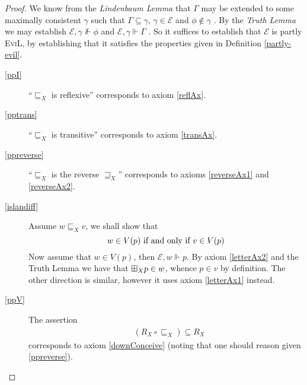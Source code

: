 \begin{proof}
We know from the \emph{Lindenbaum Lemma} that $\Gamma$ may be extended
to some maximally consistent $\gamma$ such that $\Gamma \subseteq
\gamma$, $\gamma \in \mathcal{E}$ and $\phi \nin
\gamma$ \cite[Lemma 4.17,
pg. 199]{blackburn_modal_2001}.  By the \emph{Truth Lemma} we may establish
$\mathscr{E}, \gamma \nVdash \phi$ and $\mathscr{E}, \gamma \Vdash \Gamma$ \cite[Lemma 4.21,
pgs. 201]{blackburn_modal_2001}.  So it suffices to establish
that $\mathscr{E}$ is partly \textsc{EviL}, by establishing that it
satisfies the properties given in Definition \ref{partly-evil}.

  \begin{description}
    \item[\ref{ppI}] ``$\sqsubseteq_X$ is reflexive''
      corresponds to axiom \eqref{reflAx}.
    \item[\ref{pptrans}] ``$\sqsubseteq_X$ is transitive''
      corresponds to axiom \eqref{transAx}.
    \item[\ref{ppreverse}] ``$\sqsubseteq_X$ is the
      reverse $\sqsupseteq_X$'' corresponds to axioms \eqref{reverseAx1} and
      \eqref{reverseAx2}.
    \item[\ref{islandiff}] Assume $w \sqsubseteq_X v$, we shall show
      that 
$$w \in V (p)\textup{ if and only if }v \in V (p)$$
     Now assume that $w \in V(p)$, then $\mathscr{E}, w \Vdash p$.
      By axiom \eqref{letterAx2} and the Truth Lemma we have that $\boxplus_X
      p \in w$, whence $p \in v$ by definition.  The other direction
      is similar, however it uses axiom \eqref{letterAx1} instead.
    \item[\ref{ppV}] 
The assertion
\begin{eqnarray*}
& (R_X \circ \sqsubseteq_X) \subseteq
    R_X 
\end{eqnarray*}
corresponds to axiom \eqref{downConceive} 
(noting that one should reason given \ref{ppreverse}). 




\end{description}
\end{proof}
